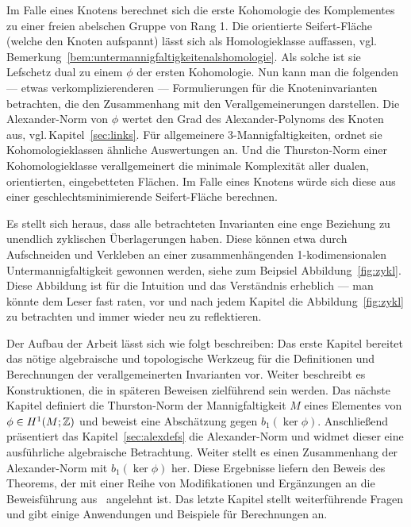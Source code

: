     Im Falle eines Knotens berechnet sich die erste Kohomologie des Komplementes zu einer freien abelschen Gruppe von Rang 1. Die orientierte Seifert-Fläche (welche den Knoten aufspannt) lässt sich als Homologieklasse auffassen, vgl.\,Bemerkung~\ref{bem:untermannigfaltigkeitenalshomologie}. Als solche ist sie Lefschetz dual zu einem $\phi$ der ersten Kohomologie. Nun kann man die folgenden --- etwas verkomplizierenderen --- Formulierungen für die Knoteninvarianten betrachten, die den Zusammenhang mit den Verallgemeinerungen darstellen. Die Alexander-Norm von $\phi$ wertet den Grad des Alexander-Polynoms des Knoten aus, vgl.\,Kapitel~\ref{sec:links}. Für allgemeinere 3-Mannigfaltigkeiten, ordnet sie Kohomologieklassen ähnliche Auswertungen an. Und die Thurston-Norm einer Kohomologieklasse verallgemeinert die minimale Komplexität aller dualen, orientierten, eingebetteten Flächen. Im Falle eines Knotens würde sich diese aus einer geschlechtsminimierende Seifert-Fläche berechnen.

    Es stellt sich heraus, dass alle betrachteten Invarianten eine enge Beziehung zu unendlich zyklischen Überlagerungen haben. Diese können etwa durch Aufschneiden und Verkleben an einer zusammenhängenden 1-kodimensionalen Untermannigfaltigkeit gewonnen werden, siehe zum Beipsiel Abbildung~\ref{fig:zykl}. Diese Abbildung ist für die Intuition und das Verständnis erheblich --- man könnte dem Leser fast raten, vor und nach jedem Kapitel die Abbildung~\ref{fig:zykl} zu betrachten und immer wieder neu zu reflektieren.

    Der Aufbau der Arbeit lässt sich wie folgt beschreiben: Das erste Kapitel bereitet das nötige algebraische und topologische Werkzeug für die Definitionen und Berechnungen der verallgemeinerten Invarianten vor. Weiter beschreibt es Konstruktionen, die in späteren Beweisen zielführend sein werden. Das nächste Kapitel definiert die Thurston-Norm der Mannigfaltigkeit $M$ eines Elementes von $\phi \in H^1(M;\mathbb{Z})$ und beweist eine Abschätzung gegen $b_1(\ker\phi)$. Anschließend präsentiert das Kapitel~\ref{sec:alexdefs} die Alexander-Norm und widmet dieser eine ausführliche algebraische Betrachtung. Weiter stellt es einen Zusammenhang der Alexander-Norm mit $b_1(\ker\phi)$ her. Diese Ergebnisse liefern den Beweis des Theorems, der mit einer Reihe von Modifikationen und Ergänzungen an die Beweisführung aus~\cite{MCMULLEN.2002} angelehnt ist. Das letzte Kapitel stellt weiterführende Fragen und gibt einige Anwendungen und Beispiele für Berechnungen an.   

